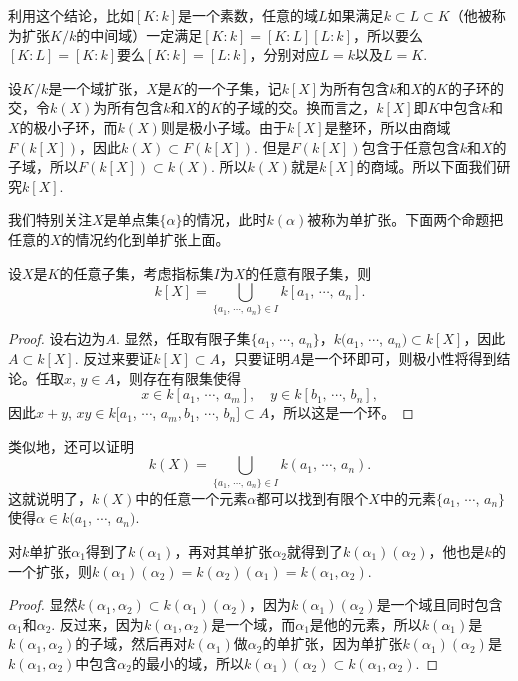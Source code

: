 利用这个结论，比如$[K:k]$是一个素数，任意的域$L$如果满足$k\subset L\subset K$（他被称为扩张$K/k$的中间域）一定满足$[K:k]=[K:L][L:k]$，所以要么$[K:L]=[K:k]$要么$[K:k]=[L:k]$，分别对应$L=k$以及$L=K$. 

\para 设$K/k$是一个域扩张，$X$是$K$的一个子集，记$k[X]$为所有包含$k$和$X$的$K$的子环的交，令$k(X)$为所有包含$k$和$X$的$K$的子域的交。换而言之，$k[X]$即$K$中包含$k$和$X$的极小子环，而$k(X)$则是极小子域。由于$k[X]$是整环，所以由商域$F(k[X])$，因此$k(X)\subset F(k[X])$. 但是$F(k[X])$包含于任意包含$k$和$X$的子域，所以$F(k[X])\subset k(X)$. 所以$k(X)$就是$k[X]$的商域。所以下面我们研究$k[X]$.

我们特别关注$X$是单点集$\{\alpha\}$的情况，此时$k(\alpha)$被称为单扩张。下面两个命题把任意的$X$的情况约化到单扩张上面。

\begin{pro}
设$X$是$K$的任意子集，考虑指标集$I$为$X$的任意有限子集，则
\[
	k[X]=\bigcup_{\{a_1,\,\cdots\!,\,a_n\}\in I} k[a_1,\,\cdots\!,\,a_n].
\]
\end{pro}

\begin{proof}
	设右边为$A$. 显然，任取有限子集$\{a_1$, $\cdots$, $a_n\}$，$k(a_1$, $\cdots$, $a_n)\subset k[X]$，因此$A\subset k[X]$. 反过来要证$k[X]\subset A$，只要证明$A$是一个环即可，则极小性将得到结论。任取$x$, $y\in A$，则存在有限集使得
	\[
		x\in k[a_1,\,\cdots\!,\,a_m],\quad y\in k[b_1,\,\cdots\!,\,b_n],
	\]
	因此$x+y$, $xy\in k[a_1$, $\cdots$, $a_m,b_1$, $\cdots$, $b_n]\subset A$，所以这是一个环。
\end{proof}

类似地，还可以证明
\[
	k(X)=\bigcup_{\{a_1,\,\cdots\!,\,a_n\}\in I} k(a_1,\,\cdots\!,\,a_n).
\]
这就说明了，$k(X)$中的任意一个元素$\alpha$都可以找到有限个$X$中的元素$\{a_1$, $\cdots$, $a_n\}$使得$\alpha\in k(a_1$, $\cdots$, $a_n)$.

\begin{pro}
对$k$单扩张$\alpha_1$得到了$k(\alpha_1)$，再对其单扩张$\alpha_2$就得到了$k(\alpha_1)(\alpha_2)$，他也是$k$的一个扩张，则$k(\alpha_1)(\alpha_2)= k(\alpha_2)(\alpha_1)=k(\alpha_1,\alpha_2)$.
\end{pro}

\begin{proof} 显然$k(\alpha_1,\alpha_2)\subset k(\alpha_1)(\alpha_2)$，因为$k(\alpha_1)(\alpha_2)$是一个域且同时包含$\alpha_1$和$\alpha_2$. 反过来，因为$k(\alpha_1,\alpha_2)$是一个域，而$\alpha_1$是他的元素，所以$k(\alpha_1)$是$k(\alpha_1,\alpha_2)$的子域，然后再对$k(\alpha_1)$做$\alpha_2$的单扩张，因为单扩张$k(\alpha_1)(\alpha_2)$是$k(\alpha_1,\alpha_2)$中包含$\alpha_2$的最小的域，所以$k(\alpha_1)(\alpha_2)\subset k(\alpha_1,\alpha_2)$.\end{proof}

